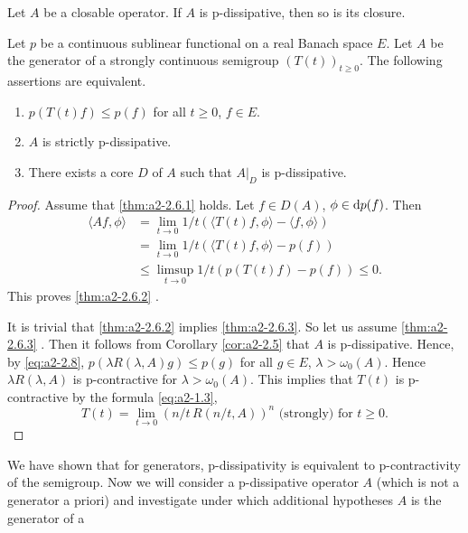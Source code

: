 \begin{corollary}\label{cor:a2-2.5}
Let $A$ be a closable operator.
If $A$ is p-dissipative, then so is its closure.
\end{corollary}
\begin{theorem}\label{thm:a2-2.6}
Let $p$ be a continuous sublinear functional on a real Banach space $E$.
Let $A$ be the generator of a strongly continuous semigroup $(T(t))_{t\geq 0}$.
The following assertions are equivalent.

\begin{enumerate}[\upshape (a)]
\item \label{thm:a2-2.6.1}
$p(T(t)f) \leq p(f)$ for all $t \geq 0$, $f \in E$.

\item \label{thm:a2-2.6.2}
$A$ is strictly p-dissipative.
 
\item \label{thm:a2-2.6.3}
There exists a core $D$ of $A$ such that $A|_{D}$ is p-dissipative.
\end{enumerate}
\end{theorem}
\begin{proof}
Assume that \ref{thm:a2-2.6.1} holds.
Let $f \in D(A)$, $\phi \in \mathop{}\!\mathrm{d}{p}(f)$.
Then 
\begin{align*}
	\langle Af,\phi \rangle &= \lim_{t\to 0} 1/t(\langle T(t)f,\phi \rangle - \langle f,\phi \rangle) \\
	&= \lim_{t\to 0} 1/t(\langle T(t)f,\phi \rangle - p(f)) \\
	&\leq \limsup_{t\to 0} 1/t(p(T(t)f) - p(f)) \leq 0. 
\end{align*}
This proves \ref{thm:a2-2.6.2} . 

It is trivial that \ref{thm:a2-2.6.2} implies \ref{thm:a2-2.6.3}.  
So let us assume \ref{thm:a2-2.6.3} . 
Then it follows from Corollary \ref{cor:a2-2.5}   that $A$ is p-dissipative.
Hence, by \eqref{eq:a2-2.8},  $p(\lambda R(\lambda,A)g) \leq p(g)$ for all $g \in E$, $\lambda > \omega_{0}(A)$.
Hence $\lambda R(\lambda,A)$ is p-contractive for $\lambda > \omega_{0}(A)$.
This implies that $T(t)$ is p-contractive by the formula \eqref{eq:a2-1.3}, 
\[
T(t) = \lim_{t\to 0} (n/t\,R(n/t,A))^{n} \text{ (strongly) for } t \geq 0.
\]
\end{proof}
We have shown that for generators, p-dissipativity is equivalent to p-contractivity of the semigroup.
Now we will consider a p-dissipative operator $A$ (which is not a generator a priori) and investigate under which additional hypotheses $A$ is the generator of a

